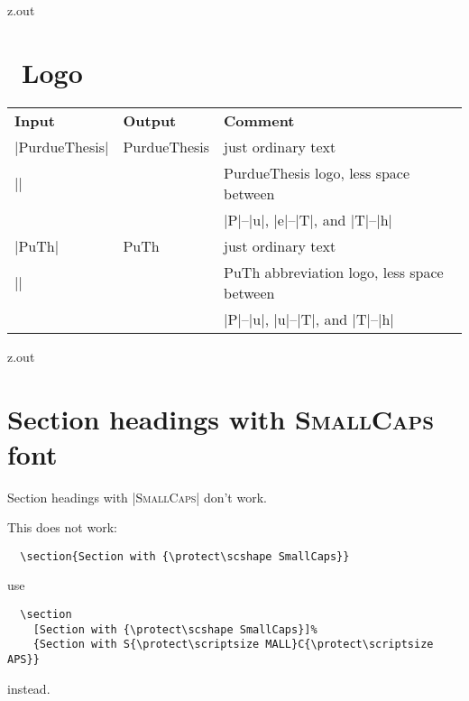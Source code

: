 \begin{VerbatimOut}{z.out}


\section{\PurdueThesisLogo\ Logo}

\begin{tabular}{@{}lll@{}}
  \bfseries Input&     \bfseries Output&  \bfseries Comment\\
  |PurdueThesis|&      PurdueThesis&      just ordinary text\\
  |\PurdueThesisLogo|& \PurdueThesisLogo& PurdueThesis logo, less space between\\
                     &                  & |P|--|u|, |e|--|T|, and |T|--|h|\\
  |PuTh|&              PuTh&              just ordinary text\\
  |\PuThLogo|&         \PuThLogo&         PuTh abbreviation logo, less space between\\
                     &                  & |P|--|u|, |u|--|T|, and |T|--|h|\\
\end{tabular}
\end{VerbatimOut}

\MyIO


\begin{VerbatimOut}{z.out}


\section{Section headings with {\protect\scshape SmallCaps} font}
\label{section-headings-with-smallcaps-font}

Section headings with |{\protect\scshape SmallCaps}| don't work.%

\mbox{}


This does not work:
\begin{verbatim}
  \section{Section with {\protect\scshape SmallCaps}}
\end{verbatim}
use
\begin{verbatim}
  \section
    [Section with {\protect\scshape SmallCaps}]%
    {Section with S{\protect\scriptsize MALL}C{\protect\scriptsize APS}}
\end{verbatim}
instead.
\end{VerbatimOut}

